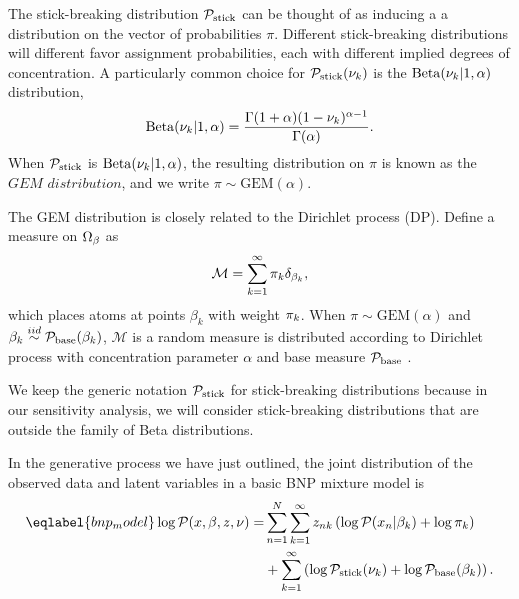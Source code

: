 The stick-breaking distribution $\mathcal{P}_{\mathrm{stick}}$ can be thought of as inducing a
a distribution on the vector of probabilities $\pi$. Different
stick-breaking distributions will different favor assignment probabilities, each
with different implied degrees of concentration.
A particularly common choice for
$\mathcal{P}_{\mathrm{stick}}(\nu_{k})$ is the $\mathrm{Beta}(\nu_{k} \vert 1, \alpha)$ distribution,
%
\begin{align*}
%
\mathrm{Beta}(\nuk \vert 1, \alpha) =
    \frac{\Gamma(1 + \alpha) (1 - \nuk)^{\alpha - 1}}
         {\Gamma(\alpha)}.
%
\end{align*}
%
When $\mathcal{P}_{\mathrm{stick}}$ is $\mathrm{Beta}(\nu_{k} \vert 1, \alpha)$, the resulting distribution on $\pi$ is known as the
$\textit{GEM distribution}$, and we write $\pi \sim \mathrm{GEM}(\alpha)$.

The GEM distribution is closely related to the Dirichlet process (DP).
Define a measure on $\Omega_{\beta}$ as
\begin{align*}
  \mathcal{M} = \sum_{k = 1}^\infty \pi_k\delta_{\beta_k},
\end{align*}
which places atoms at points $\beta_k$ with weight $\pi_k$.
When $\pi \sim \mathrm{GEM}(\alpha)$ and
$\beta_k \overset{iid}{\sim} \mathcal{P}_{\mathrm{base}}(\beta_k)$, $\mathcal{M}$ is a random measure
is distributed according to Dirichlet process with concentration parameter
$\alpha$ and base measure $\mathcal{P}_{\mathrm{base}}$
\citep{ferguson:1973:bayesian, sethuraman:1994:constructivedp}.

We keep the generic notation $\mathcal{P}_{\mathrm{stick}}$ for stick-breaking distributions
because in our sensitivity analysis,
we will consider stick-breaking distributions that are outside the
family of Beta distributions.

In the generative process we have just outlined,
the joint distribution of
the observed data and latent variables in a basic BNP mixture model is
%
\begin{align}\eqlabel{bnp_model}
%
\logp(\x, \beta, \z, \nu) =&
\sum_{n=1}^N \sum_{k=1}^{\infty}
    \z_{\n\k} \left(
        \logp(\x_n \vert \beta_\k) + \log \pi_\k
    \right)
\nonumber\\
   & +
    \sum_{k=1}^{\infty} \left(
        \log \pstick(\nuk) + \log \pbetaprior(\beta_\k)
    \right).
%
\end{align}
%


